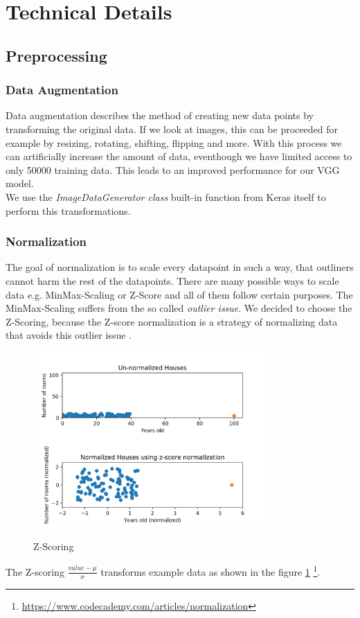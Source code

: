 \documentclass[journal]{IEEEtran}
\begin{document}
\section{Technical Details}
\label{sec:techDetails}
\subsection{Preprocessing}
\subsubsection{Data Augmentation}
\noindent Data augmentation describes the method of creating new data points by transforming the original data. If we look at images, this can be proceeded for example by resizing, rotating, shifting, flipping and more.
With this process we can artificially increase the amount of data, eventhough we have limited access to only 50000 training data. 
This leads to an improved performance for our VGG model. \\
We use the \textit{ImageDataGenerator class} built-in function from Keras itself to perform this transformations. \\

\subsubsection{Normalization}
\noindent The goal of normalization is to scale every datapoint in such a way, that outliners cannot harm the rest of the datapoints. There are many possible ways to scale data e.g. MinMax-Scaling or Z-Score and all of them follow certain purposes. 
The MinMax-Scaling suffers from the so called \textit{outlier issue}.
We decided to choose the Z-Scoring, because the Z-score normalization is a strategy of normalizing data that avoids this outlier issue \cite{RN6}. \\
\begin{figure}
  \begin{center}
  \includegraphics[width=3.5in]{photo/z-score.png}\\
  \caption{Z-Scoring}\label{zscore}
  \end{center}
\end{figure}
The Z-scoring \(\frac{value - \mu}{\sigma}\) transforms example data as shown in the figure \ref{zscore} \footnote{\href{https://www.codecademy.com/articles/normalization}{https://www.codecademy.com/articles/normalization}}.
\end{document}
